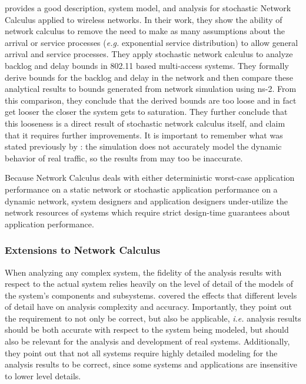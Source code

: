 \cite{SNC80211backlogdelay2011} provides a good description, system
model, and analysis for stochastic Network Calculus applied to
wireless networks.  In their work, they show the ability of network
calculus to remove the need to make as many assumptions about the
arrival or service processes (\emph{e.g.} exponential service
distribution) to allow general arrival and service processes.  They
apply stochastic network calculus to analyze backlog and delay bounds
in 802.11 based multi-access systems.  They formally derive bounds for
the backlog and delay in the network and then compare these analytical
results to bounds generated from network simulation using ns-2.  From
this comparison, they conclude that the derived bounds are too loose
and in fact get looser the closer the system gets to saturation.  They
further conclude that this looseness is a direct result of stochastic
network calculus itself, and claim that it requires further
improvements.  It is important to remember what was stated previously
by \cite{simulator_comparison_2003}: the simulation does not
accurately model the dynamic behavior of real traffic, so the results
from \cite{SNC80211backlogdelay2011} may too be inaccurate.

Because Network Calculus deals with either deterministic worst-case
application performance on a static network or stochastic application
performance on a dynamic network, system designers and application
designers under-utilize the network resources of systems which require
strict design-time guarantees about application performance.

\subsubsection{Extensions to Network Calculus}
When analyzing any complex system, the fidelity of the analysis
results with respect to the actual system relies heavily on the level
of detail of the models of the system's components and
subsystems. \cite{Heidemann2001} covered the effects that different
levels of detail have on analysis complexity and accuracy.
Importantly, they point out the requirement to not only be correct,
but also be applicable, \emph{i.e.} analysis results should be both
accurate with respect to the system being modeled, but should also be
relevant for the analysis and development of real systems.
Additionally, they point out that not all systems require highly
detailed modeling for the analysis results to be correct, since some
systems and applications are insensitive to lower level details.


